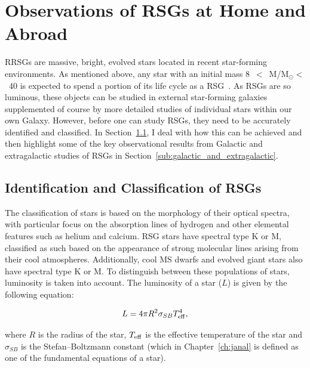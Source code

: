 
\section{Observations of RSGs at Home and Abroad} %
\label{sec:rsg_observations}

RRSGs are massive, bright, evolved stars located in recent star-forming environments.
As mentioned above, any star with an initial mass 8~$<$~M/M$_{\odot}<$~40 is expected to spend a portion of its life cycle as a RSG~\citep{2000A&A...361..101M,Massey03, 2007ARA&A..45..177C, Meynet11}.
As RSGs are so luminous, these objects can be studied in external star-forming galaxies supplemented of course by more detailed studies of individual stars within our own Galaxy.
However, before one can study RSGs, they need to be accurately identified and classified. In Section~\ref{sub:selection_of_rsgs}, I deal with how this can be achieved and then highlight some of the key observational results from Galactic and extragalactic studies of RSGs in Section~\ref{sub:galactic_and_extragalactic}.

\subsection{Identification and Classification of RSGs} %
\label{sub:selection_of_rsgs}

The classification of stars is based on the morphology of their optical spectra, with particular focus on the absorption lines of hydrogen and other elemental features such as helium and calcium.
RSG stars have spectral type K or M, classified as such based on the appearance of strong molecular lines arising from their cool atmospheres.
Additionally, cool MS dwarfs and evolved giant stars also have spectral type K or M.
To distinguish between these populations of stars, luminosity is taken into account.
The luminosity of a star ($L$) is given by the following equation:

\begin{equation}
    L = 4\pi R^2\sigma_{SB}T_{\rm eff}^4,
\end{equation}

\noindent where $R$ is the radius of the star, $T_{\rm eff}$ is the effective temperature of the star and $\sigma_{SB}$ is the Stefan--Boltzmann constant (which in Chapter~\ref{ch:janal} is defined as one of the fundamental equations of a star).

